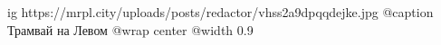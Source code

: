  
 
 
 
 

\ifcmt
  ig https://mrpl.city/uploads/posts/redactor/vhss2a9dpqqdejke.jpg
	@caption Трамвай на Левом
  @wrap center
  @width 0.9
\fi
